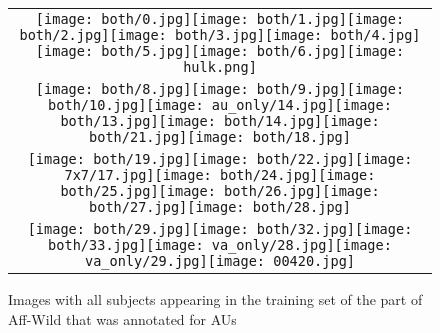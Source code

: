 \documentclass[a4paper, 10pt, conference]{ieeeconf}      %
\begin{document}
\begin{figure}[h]
\centering
\begin{tabular}{ c  }
\texttt{[image: both/0.jpg]}\texttt{[image: both/1.jpg]}\texttt{[image: both/2.jpg]}\texttt{[image: both/3.jpg]}\texttt{[image: both/4.jpg]}\texttt{[image: both/5.jpg]}\texttt{[image: both/6.jpg]}\texttt{[image: hulk.png]}\\
\texttt{[image: both/8.jpg]}\texttt{[image: both/9.jpg]}\texttt{[image: both/10.jpg]}\texttt{[image: au\_only/14.jpg]}\texttt{[image: both/13.jpg]}\texttt{[image: both/14.jpg]}\texttt{[image: both/21.jpg]}\texttt{[image: both/18.jpg]}\\
 \texttt{[image: both/19.jpg]}\texttt{[image: both/22.jpg]}\texttt{[image: 7x7/17.jpg]}\texttt{[image: both/24.jpg]}\texttt{[image: both/25.jpg]}\texttt{[image: both/26.jpg]}\texttt{[image: both/27.jpg]}\texttt{[image: both/28.jpg]}\\
\texttt{[image: both/29.jpg]}\texttt{[image: both/32.jpg]}\texttt{[image: both/33.jpg]}\texttt{[image: va\_only/28.jpg]}\texttt{[image: va\_only/29.jpg]}\texttt{[image: 00420.jpg]} 
\end{tabular}
\caption{Images with all subjects appearing in the training set of the part of Aff-Wild that was annotated for AUs}
\label{all_identities}
\end{figure}
 
\end{document}
